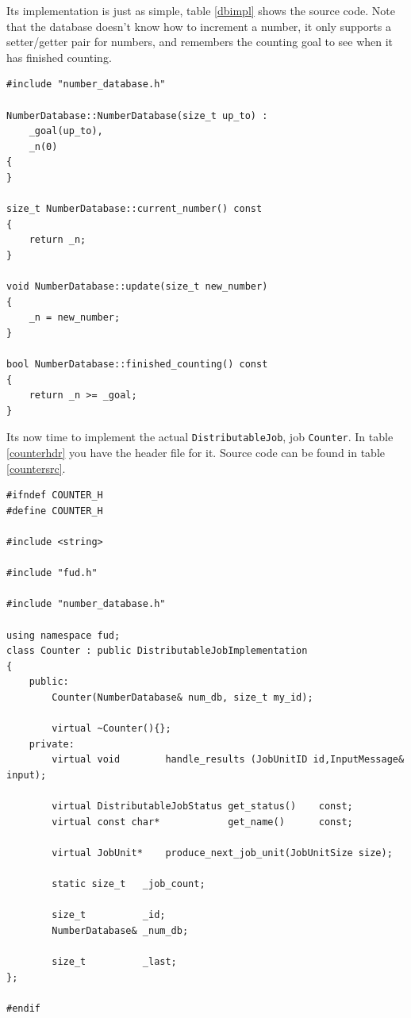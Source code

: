 \documentclass[a4paper,12pt,english]{article}
\renewcommand{\DJ}{\texttt{DistributableJob}}
\begin{document}
Its implementation is just as simple, table \ref{dbimpl} shows the source code. Note that the database doesn't know how to increment a number, it only supports a setter/getter pair for numbers, and remembers the counting goal to see when it has finished counting.

\begin{table}[!htb]
\lstset{language=C++}
\begin{lstlisting}[frame=single]
#include "number_database.h"

NumberDatabase::NumberDatabase(size_t up_to) :
    _goal(up_to),
    _n(0)
{
}

size_t NumberDatabase::current_number() const
{
    return _n;
}

void NumberDatabase::update(size_t new_number)
{
    _n = new_number;
}

bool NumberDatabase::finished_counting() const
{
    return _n >= _goal;
}
\end{lstlisting}
\centering \caption{Implementation file for \texttt{NumberDatabase} class.} \label{dbimpl}
\end{table}

Its now time to implement the actual \DJ, job \texttt{Counter}. In table \ref{counterhdr} you have the header file for it. Source code can be found in table \ref{countersrc}.

\begin{table}[!htb]
\lstset{language=C++}
\begin{tiny}
\begin{lstlisting}[frame=single]
#ifndef COUNTER_H
#define COUNTER_H

#include <string>

#include "fud.h"

#include "number_database.h"

using namespace fud;
class Counter : public DistributableJobImplementation
{
    public:
        Counter(NumberDatabase& num_db, size_t my_id);

        virtual ~Counter(){};
    private:
        virtual void        handle_results (JobUnitID id,InputMessage& input);

        virtual DistributableJobStatus get_status()    const;
        virtual const char*            get_name()      const;

        virtual JobUnit*    produce_next_job_unit(JobUnitSize size);

        static size_t   _job_count;

        size_t          _id;
        NumberDatabase& _num_db;

        size_t          _last;
};

#endif
\end{lstlisting}
\end{tiny}
\centering \caption{Header file for Counter \DJ.} \label{counterhdr}
\end{table}
\end{document}
